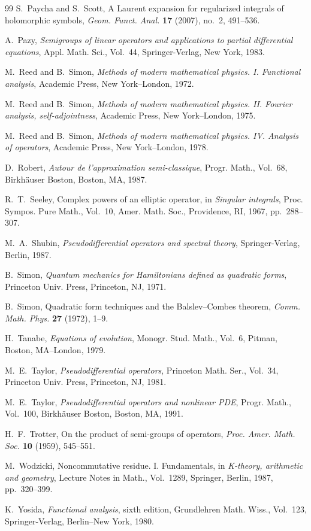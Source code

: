 \documentclass[11pt]{amsart}
\theoremstyle{plain}
\theoremstyle{definition}
\theoremstyle{remark}
\begin{document}
\begin{thebibliography}{99}
S.~Paycha and S.~Scott,
A Laurent expansion for regularized integrals of holomorphic symbols,
\emph{Geom. Funct. Anal.} \textbf{17} (2007), no.~2, 491--536.

A.~Pazy,
\emph{Semigroups of linear operators and applications to partial differential
equations},
Appl. Math. Sci., Vol.~44,
Springer-Verlag, New York, 1983.

M.~Reed and B.~Simon,
\emph{Methods of modern mathematical physics. I. Functional analysis},
Academic Press, New York--London, 1972.

M.~Reed and B.~Simon,
\emph{Methods of modern mathematical physics. II. Fourier analysis,
self-adjointness},
Academic Press, New York--London, 1975.

M.~Reed and B.~Simon,
\emph{Methods of modern mathematical physics. IV. Analysis of operators},
Academic Press, New York--London, 1978.

D.~Robert,
\emph{Autour de l'approximation semi-classique},
Progr. Math., Vol.~68,
Birkh\"auser Boston, Boston, MA, 1987.

R.~T.~Seeley,
Complex powers of an elliptic operator,
in \emph{Singular integrals},
Proc. Sympos. Pure Math., Vol.~10,
Amer. Math. Soc., Providence, RI, 1967, pp.~288--307.

M.~A.~Shubin,
\emph{Pseudodifferential operators and spectral theory},
Springer-Verlag, Berlin, 1987.

B.~Simon,
\emph{Quantum mechanics for Hamiltonians defined as quadratic forms},
Princeton Univ. Press, Princeton, NJ, 1971.

B.~Simon,
Quadratic form techniques and the Balslev--Combes theorem,
\emph{Comm. Math. Phys.} \textbf{27} (1972), 1--9.

H.~Tanabe,
\emph{Equations of evolution},
Monogr. Stud. Math., Vol.~6,
Pitman, Boston, MA--London, 1979.

M.~E.~Taylor,
\emph{Pseudodifferential operators},
Princeton Math. Ser., Vol.~34,
Princeton Univ. Press, Princeton, NJ, 1981.

M.~E.~Taylor,
\emph{Pseudodifferential operators and nonlinear PDE},
Progr. Math., Vol.~100,
Birkh\"auser Boston, Boston, MA, 1991.

H.~F.~Trotter,
On the product of semi-groups of operators,
\emph{Proc. Amer. Math. Soc.} \textbf{10} (1959), 545--551.

M.~Wodzicki,
Noncommutative residue. I. Fundamentals,
in \emph{K-theory, arithmetic and geometry},
Lecture Notes in Math., Vol.~1289,
Springer, Berlin, 1987, pp.~320--399.

K.~Yosida,
\emph{Functional analysis},
sixth edition,
Grundlehren Math. Wiss., Vol.~123,
Springer-Verlag, Berlin--New York, 1980.

\end{thebibliography}
\end{document}

